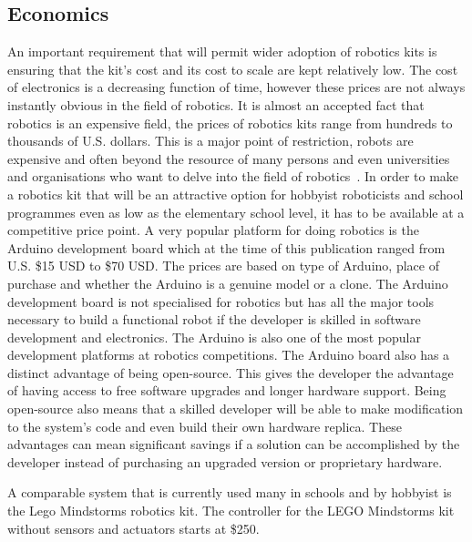 \subsection{Economics} %
An important requirement that will permit wider adoption of robotics kits is ensuring that the kit's cost and its cost to scale are kept relatively low. The cost of electronics is a decreasing function of time, however these prices are not always instantly obvious in the field of robotics. It is almost an accepted fact that robotics is an expensive field, the prices of robotics kits range from hundreds to thousands of U.S. dollars. This is a major point of restriction, robots are expensive and often beyond the resource of many persons and even universities and organisations who want to delve into the field of robotics~\parencite{vr}. In order to make a robotics kit that will be an attractive option for hobbyist roboticists and school programmes even as low as the elementary school level, it has to be available at a competitive price point. A very popular platform for doing robotics is the Arduino development board which at the time of this publication ranged from U.S. \$15 USD to \$70 USD. The prices are based on type of Arduino, place of purchase and whether the Arduino is a genuine model or a clone. The Arduino development board is not specialised for robotics but has all the major tools necessary to build a functional robot if the developer is skilled in software development and electronics. The Arduino is also one of the most popular development platforms at robotics competitions.
The Arduino board also has a distinct advantage of being open-source. This gives the developer the advantage of having access to free software upgrades and longer hardware support. Being open-source also means that a skilled developer will be able to make modification to the system's code and even build their own hardware replica. These advantages can mean significant savings if a solution can be accomplished by the developer instead of purchasing an upgraded version or proprietary hardware.

A comparable system that is currently used many in schools and by hobbyist is the Lego Mindstorms robotics kit. The controller for the LEGO Mindstorms kit without sensors and actuators starts at \$250. 

\label{sub:economics}


